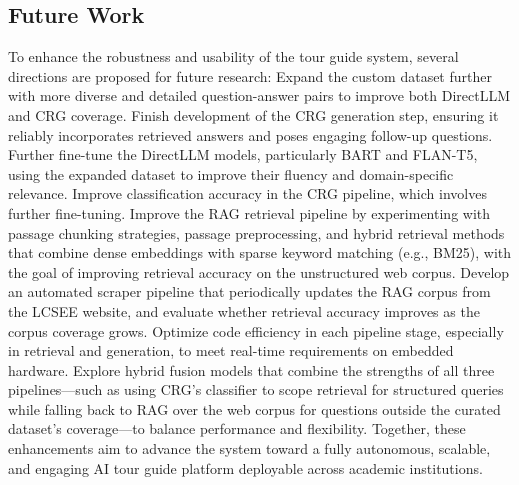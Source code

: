 \documentclass[conference]{IEEEtran}
\begin{document}
\subsection*{Future Work}
To enhance the robustness and usability of the tour guide system, several directions are proposed for future research:
Expand the custom dataset further with more diverse and detailed question-answer pairs to improve both DirectLLM and CRG coverage.
Finish development of the CRG generation step, ensuring it reliably incorporates retrieved answers and poses engaging follow-up questions.
Further fine-tune the DirectLLM models, particularly BART and FLAN-T5, using the expanded dataset to improve their fluency and domain-specific relevance.
Improve classification accuracy in the CRG pipeline, which involves further fine-tuning.
Improve the RAG retrieval pipeline by experimenting with passage chunking strategies, passage preprocessing, and hybrid retrieval methods that combine dense embeddings with sparse keyword matching (e.g., BM25), with the goal of improving retrieval accuracy on the unstructured web corpus.
Develop an automated scraper pipeline that periodically updates the RAG corpus from the LCSEE website, and evaluate whether retrieval accuracy improves as the corpus coverage grows.
Optimize code efficiency in each pipeline stage, especially in retrieval and generation, to meet real-time requirements on embedded hardware.
Explore hybrid fusion models that combine the strengths of all three pipelines---such as using CRG's classifier to scope retrieval for structured queries while falling back to RAG over the web corpus for questions outside the curated dataset's coverage---to balance performance and flexibility.
Together, these enhancements aim to advance the system toward a fully autonomous, scalable, and engaging AI tour guide platform deployable across academic institutions.
\end{document}
